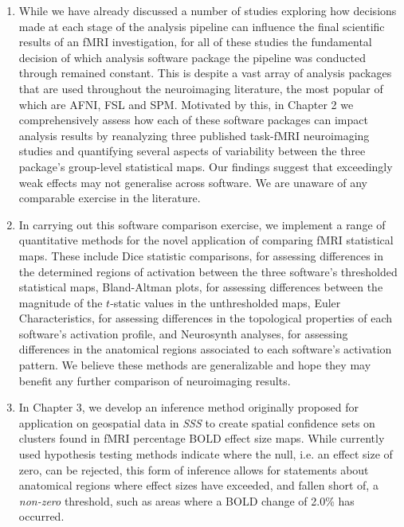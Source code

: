 \begin{enumerate}

\item While we have already discussed a number of studies exploring how decisions made at each stage of the analysis pipeline can influence the final scientific results of an fMRI investigation, for all of these studies the fundamental decision of which analysis software package the pipeline was conducted through remained constant. This is despite a vast array of analysis packages that are used throughout the neuroimaging literature, the most popular of which are AFNI, FSL and SPM. Motivated by this, in Chapter 2 we comprehensively assess how each of these software packages can impact analysis results by reanalyzing three published task-fMRI neuroimaging studies and quantifying several aspects of variability between the three package's group-level statistical maps. Our findings suggest that exceedingly weak effects may not generalise across software. We are unaware of any comparable exercise in the literature.  

\item In carrying out this software comparison exercise, we implement a range of quantitative methods for the novel application of comparing fMRI statistical maps. These include Dice statistic comparisons, for assessing differences in the determined regions of activation between the three software's thresholded statistical maps, Bland-Altman plots, for assessing differences between the magnitude of the $t$-static values in the unthresholded maps, Euler Characteristics, for assessing differences in the topological properties of each software's activation profile, and Neurosynth analyses, for assessing differences in the anatomical regions associated to each software's activation pattern. We believe these methods are generalizable and hope they may benefit any further comparison of neuroimaging results. 

\item In Chapter 3, we develop an inference method originally proposed for application on geospatial data in \citet*{Sommerfeld2018-zl} \textit{SSS} to create spatial confidence sets on clusters found in fMRI percentage BOLD effect size maps. While currently used hypothesis testing methods indicate where the null, i.e. an effect size of zero, can be rejected, this form of inference allows for statements about anatomical regions where effect sizes have exceeded, and fallen short of, a \textit{non-zero} threshold, such as areas where a BOLD change of 2.0\% has occurred. 


\end{enumerate}
